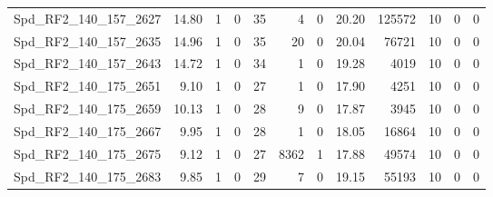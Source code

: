 \begin{longtable}[c]{@{}lrrrrrrrrrrr@{}}
Spd\_RF2\_140\_157\_2627     & 14.80                  & 1                       & 0                       & 35                     & 4                       & 0                       & 20.20                   & 125572                   & 10                       & 0                        & 0                        \\
Spd\_RF2\_140\_157\_2635     & 14.96                  & 1                       & 0                       & 35                     & 20                      & 0                       & 20.04                   & 76721                    & 10                       & 0                        & 0                        \\
Spd\_RF2\_140\_157\_2643     & 14.72                  & 1                       & 0                       & 34                     & 1                       & 0                       & 19.28                   & 4019                     & 10                       & 0                        & 0                        \\
Spd\_RF2\_140\_175\_2651     & 9.10                   & 1                       & 0                       & 27                     & 1                       & 0                       & 17.90                   & 4251                     & 10                       & 0                        & 0                        \\
Spd\_RF2\_140\_175\_2659     & 10.13                  & 1                       & 0                       & 28                     & 9                       & 0                       & 17.87                   & 3945                     & 10                       & 0                        & 0                        \\
Spd\_RF2\_140\_175\_2667     & 9.95                   & 1                       & 0                       & 28                     & 1                       & 0                       & 18.05                   & 16864                    & 10                       & 0                        & 0                        \\
Spd\_RF2\_140\_175\_2675     & 9.12                   & 1                       & 0                       & 27                     & 8362                    & 1                       & 17.88                   & 49574                    & 10                       & 0                        & 0                        \\
Spd\_RF2\_140\_175\_2683     & 9.85                   & 1                       & 0                       & 29                     & 7                       & 0                       & 19.15                   & 55193                    & 10                       & 0                        & 0                        \\

\end{longtable}
